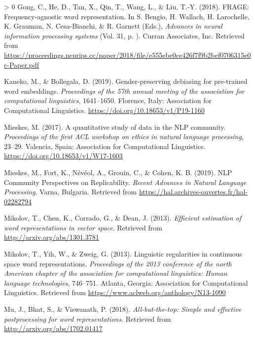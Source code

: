 \documentclass[
  english,
  man,floatsintext]{apa6}
\newlength{\cslhangindent}
\newenvironment{CSLReferences}[3] %
 {%
  \setlength{\parindent}{0pt}
  \ifodd #1 \everypar{\setlength{\hangindent}{\cslhangindent}}\ignorespaces\fi
  \ifnum #2 > 0
  \setlength{\parskip}{#3\baselineskip}
  \fi
 }%
 {}
\begin{document}
\begin{CSLReferences}{1}{0}
\leavevmode\hypertarget{ref-gong_2018}{}%
Gong, C., He, D., Tan, X., Qin, T., Wang, L., \& Liu, T.-Y. (2018). FRAGE: Frequency-agnostic word representation. In S. Bengio, H. Wallach, H. Larochelle, K. Grauman, N. Cesa-Bianchi, \& R. Garnett (Eds.), \emph{Advances in neural information processing systems} (Vol. 31, p. ). Curran Associates, Inc. Retrieved from \url{https://proceedings.neurips.cc/paper/2018/file/e555ebe0ce426f7f9b2bef0706315e0c-Paper.pdf}

\leavevmode\hypertarget{ref-kaneko_2019}{}%
Kaneko, M., \& Bollegala, D. (2019). Gender-preserving debiasing for pre-trained word embeddings. \emph{Proceedings of the 57th annual meeting of the association for computational linguistics}, 1641--1650. Florence, Italy: Association for Computational Linguistics. \url{https://doi.org/10.18653/v1/P19-1160}

\leavevmode\hypertarget{ref-mieskes_2017}{}%
Mieskes, M. (2017). A quantitative study of data in the {NLP} community. \emph{Proceedings of the first {ACL} workshop on ethics in natural language processing}, 23--29. Valencia, Spain: Association for Computational Linguistics. \url{https://doi.org/10.18653/v1/W17-1603}

\leavevmode\hypertarget{ref-mieskes_2019}{}%
Mieskes, M., Fort, K., Névéol, A., Grouin, C., \& Cohen, K. B. (2019). {NLP Community Perspectives on Replicability.} \emph{{Recent Advances in Natural Language Processing}}. Varna, Bulgaria. Retrieved from \url{https://hal.archives-ouvertes.fr/hal-02282794}

\leavevmode\hypertarget{ref-mikolov2013Google}{}%
Mikolov, T., Chen, K., Corrado, G., \& Dean, J. (2013). \emph{Efficient estimation of word representations in vector space}. Retrieved from \url{http://arxiv.org/abs/1301.3781}

\leavevmode\hypertarget{ref-mikolov2013MSR}{}%
Mikolov, T., Yih, W., \& Zweig, G. (2013). Linguistic regularities in continuous space word representations. \emph{Proceedings of the 2013 conference of the north {A}merican chapter of the association for computational linguistics: Human language technologies}, 746--751. Atlanta, Georgia: Association for Computational Linguistics. Retrieved from \url{https://www.aclweb.org/anthology/N13-1090}

\leavevmode\hypertarget{ref-mu_2018}{}%
Mu, J., Bhat, S., \& Viswanath, P. (2018). \emph{All-but-the-top: Simple and effective postprocessing for word representations}. Retrieved from \url{http://arxiv.org/abs/1702.01417}


\end{CSLReferences}
\end{document}
